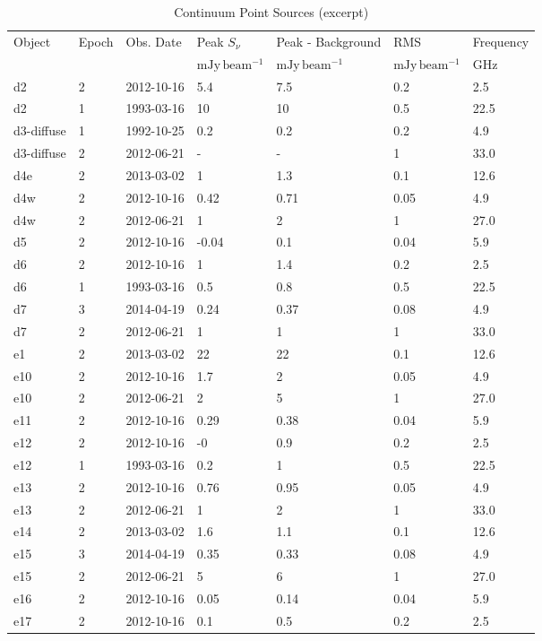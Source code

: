 \begin{table*}[htp]
\caption{Continuum Point Sources (excerpt)}
\begin{tabular}{llll}
\label{tab:contsrcs}
Object & Epoch & Obs. Date & Peak $S_{\nu}$ & Peak - Background & RMS & Frequency \\
 &  &  & $\mathrm{mJy\,beam^{-1}}$ & $\mathrm{mJy\,beam^{-1}}$ & $\mathrm{mJy\,beam^{-1}}$ & $\mathrm{GHz}$ \\
\hline
d2 & 2 & 2012-10-16 & 5.4 & 7.5 & 0.2 & 2.5 \\
d2 & 1 & 1993-03-16 & 10 & 10 & 0.5 & 22.5 \\
d3-diffuse & 1 & 1992-10-25 & 0.2 & 0.2 & 0.2 & 4.9 \\
d3-diffuse & 2 & 2012-06-21 & - & - & 1 & 33.0 \\
d4e & 2 & 2013-03-02 & 1 & 1.3 & 0.1 & 12.6 \\
d4w & 2 & 2012-10-16 & 0.42 & 0.71 & 0.05 & 4.9 \\
d4w & 2 & 2012-06-21 & 1 & 2 & 1 & 27.0 \\
d5 & 2 & 2012-10-16 & -0.04 & 0.1 & 0.04 & 5.9 \\
d6 & 2 & 2012-10-16 & 1 & 1.4 & 0.2 & 2.5 \\
d6 & 1 & 1993-03-16 & 0.5 & 0.8 & 0.5 & 22.5 \\
d7 & 3 & 2014-04-19 & 0.24 & 0.37 & 0.08 & 4.9 \\
d7 & 2 & 2012-06-21 & 1 & 1 & 1 & 33.0 \\
e1 & 2 & 2013-03-02 & 22 & 22 & 0.1 & 12.6 \\
e10 & 2 & 2012-10-16 & 1.7 & 2 & 0.05 & 4.9 \\
e10 & 2 & 2012-06-21 & 2 & 5 & 1 & 27.0 \\
e11 & 2 & 2012-10-16 & 0.29 & 0.38 & 0.04 & 5.9 \\
e12 & 2 & 2012-10-16 & -0 & 0.9 & 0.2 & 2.5 \\
e12 & 1 & 1993-03-16 & 0.2 & 1 & 0.5 & 22.5 \\
e13 & 2 & 2012-10-16 & 0.76 & 0.95 & 0.05 & 4.9 \\
e13 & 2 & 2012-06-21 & 1 & 2 & 1 & 33.0 \\
e14 & 2 & 2013-03-02 & 1.6 & 1.1 & 0.1 & 12.6 \\
e15 & 3 & 2014-04-19 & 0.35 & 0.33 & 0.08 & 4.9 \\
e15 & 2 & 2012-06-21 & 5 & 6 & 1 & 27.0 \\
e16 & 2 & 2012-10-16 & 0.05 & 0.14 & 0.04 & 5.9 \\
e17 & 2 & 2012-10-16 & 0.1 & 0.5 & 0.2 & 2.5 \\

\end{tabular}
\end{table*}
